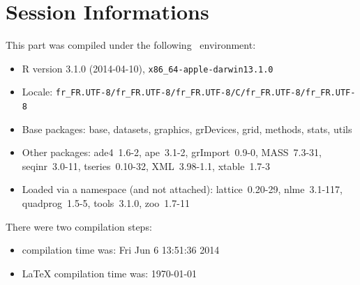 \documentclass{article}
\begin{document}
%
%
%
%
%
%
%
%


\section*{Session Informations}

\begin{scriptsize}

This part was compiled under the following \Rlogo{}~environment:

\begin{itemize}\raggedright
  \item R version 3.1.0 (2014-04-10), \verb|x86_64-apple-darwin13.1.0|
  \item Locale: \verb|fr_FR.UTF-8/fr_FR.UTF-8/fr_FR.UTF-8/C/fr_FR.UTF-8/fr_FR.UTF-8|
  \item Base packages: base, datasets, graphics, grDevices, grid,
    methods, stats, utils
  \item Other packages: ade4~1.6-2, ape~3.1-2, grImport~0.9-0,
    MASS~7.3-31, seqinr~3.0-11, tseries~0.10-32, XML~3.98-1.1,
    xtable~1.7-3
  \item Loaded via a namespace (and not attached): lattice~0.20-29,
    nlme~3.1-117, quadprog~1.5-5, tools~3.1.0, zoo~1.7-11
\end{itemize}
There were two compilation steps:

\begin{itemize}
  \item \Rlogo{} compilation time was: Fri Jun  6 13:51:36 2014
  \item \LaTeX{} compilation time was: \today
\end{itemize}

\end{scriptsize}


\clearpage
{}


\end{document}
